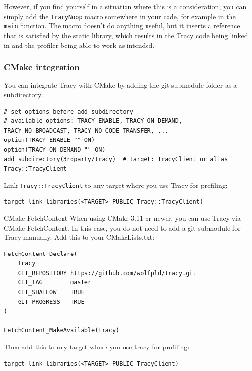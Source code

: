 \documentclass[hidelinks,titlepage,a4paper,twoside]{article}
\begin{document}
However, if you find yourself in a situation where this is a consideration, you can simply add the \texttt{TracyNoop} macro somewhere in your code, for example in the \texttt{main} function. The macro doesn't do anything useful, but it inserts a reference that is satisfied by the static library, which results in the Tracy code being linked in and the profiler being able to work as intended.

\subsubsection{CMake integration}

You can integrate Tracy with CMake by adding the git submodule folder as a subdirectory.

\begin{lstlisting}
# set options before add_subdirectory
# available options: TRACY_ENABLE, TRACY_ON_DEMAND, TRACY_NO_BROADCAST, TRACY_NO_CODE_TRANSFER, ...
option(TRACY_ENABLE "" ON)
option(TRACY_ON_DEMAND "" ON)
add_subdirectory(3rdparty/tracy)  # target: TracyClient or alias Tracy::TracyClient
\end{lstlisting}

Link \texttt{Tracy::TracyClient} to any target where you use Tracy for profiling:

\begin{lstlisting}
target_link_libraries(<TARGET> PUBLIC Tracy::TracyClient)
\end{lstlisting}

\begin{bclogo}[
noborder=true,
couleur=black!5,
logo=\bclampe
]{CMake FetchContent}
When using CMake 3.11 or newer, you can use Tracy via CMake FetchContent. In this case, you do not need to add a git submodule for Tracy manually. Add this to your CMakeLists.txt:

\begin{lstlisting}
FetchContent_Declare(
    tracy
    GIT_REPOSITORY https://github.com/wolfpld/tracy.git
    GIT_TAG        master
    GIT_SHALLOW    TRUE
    GIT_PROGRESS   TRUE
)

FetchContent_MakeAvailable(tracy)
\end{lstlisting}

Then add this to any target where you use tracy for profiling:

\begin{lstlisting}
target_link_libraries(<TARGET> PUBLIC TracyClient)
\end{lstlisting}
\end{bclogo}
\end{document}

